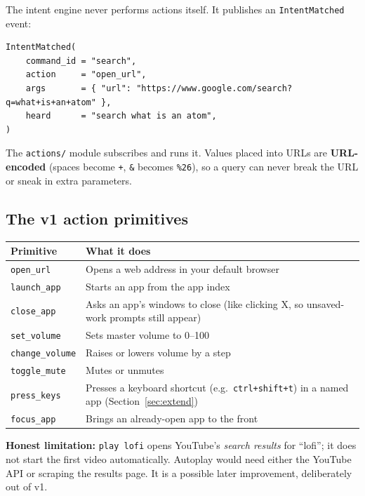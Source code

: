 \documentclass[11pt,a4paper]{article}
\begin{document}
The intent engine never performs actions itself. It publishes an \texttt{IntentMatched} event:

\begin{lstlisting}
IntentMatched(
    command_id = "search",
    action     = "open_url",
    args       = { "url": "https://www.google.com/search?q=what+is+an+atom" },
    heard      = "search what is an atom",
)
\end{lstlisting}

\noindent The \texttt{actions/} module subscribes and runs it. Values placed into URLs are
\textbf{URL-encoded} (spaces become \texttt{+}, \texttt{\&} becomes \texttt{\%26}), so a
query can never break the URL or sneak in extra parameters.

\subsection{The v1 action primitives}
\begin{center}
\renewcommand{\arraystretch}{1.2}
\begin{tabularx}{\textwidth}{l X}
\toprule
\textbf{Primitive} & \textbf{What it does} \\
\midrule
\texttt{open\_url}      & Opens a web address in your default browser \\
\texttt{launch\_app}    & Starts an app from the app index \\
\texttt{close\_app}     & Asks an app's windows to close (like clicking X, so unsaved-work prompts still appear) \\
\texttt{set\_volume}    & Sets master volume to 0--100 \\
\texttt{change\_volume} & Raises or lowers volume by a step \\
\texttt{toggle\_mute}   & Mutes or unmutes \\
\texttt{press\_keys}    & Presses a keyboard shortcut (e.g.\ \texttt{ctrl+shift+t}) in a named app (Section~\ref{sec:extend}) \\
\texttt{focus\_app}     & Brings an already-open app to the front \\
\bottomrule
\end{tabularx}
\end{center}

\begin{caution}
\textbf{Honest limitation:} \texttt{play lofi} opens YouTube's \emph{search results} for
``lofi''; it does not start the first video automatically. Autoplay would need either the
YouTube API or scraping the results page. It is a possible later improvement, deliberately out
of v1.
\end{caution}
\end{document}

